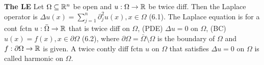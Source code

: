 {\bf The LE}
Let $\Omega \subseteq \mathbb{R}^n$ be open and $u: \Omega \rightarrow \mathbb{R}$ be twice diff.  Then the Laplace operator is  $\Delta u(x) = \sum_{j=1}^n \partial_j^2 u(x), x \in \Omega$ (6.1). The Laplace equation is for a cont fctn $u: \bar{\Omega} \rightarrow \mathbb{R}$ that is twice diff on $\Omega$, (PDE) $\Delta u = 0$ on $\Omega$, (BC) $u(x) = f(x), x \in \partial \Omega$ (6.2), where $\partial \Omega =\bar{\Omega} \setminus \Omega$ is the boundary of $\Omega$ and $f: \partial \Omega \rightarrow \mathbb{R}$ is given.  A twice contly diff fctn $u$ on $\Omega$ that satisfies $\Delta u =0$ on $\Omega$ is called harmonic on $\Omega$.